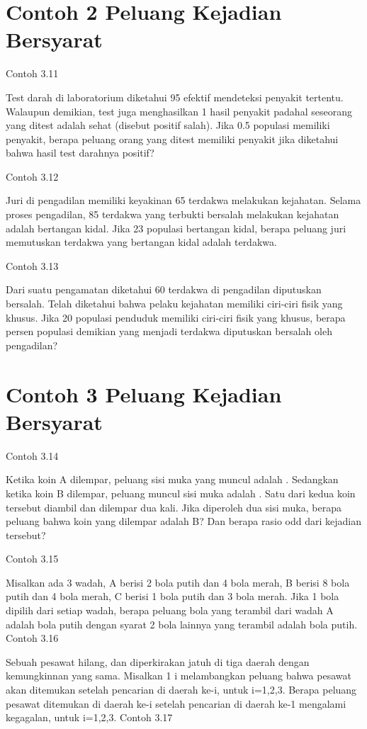 \documentclass[11pt,fleqn]{book} %
\begin{document}
{{\section{Contoh 2 Peluang Kejadian Bersyarat}

Contoh 3.11

Test darah di laboratorium diketahui 95 efektif mendeteksi penyakit tertentu. Walaupun demikian, test juga menghasilkan 1 hasil penyakit padahal seseorang yang ditest adalah sehat (disebut positif salah). Jika 0.5 populasi memiliki penyakit, berapa peluang orang yang ditest memiliki penyakit jika diketahui bahwa hasil test darahnya positif?

Contoh 3.12

Juri di pengadilan memiliki keyakinan 65 terdakwa melakukan kejahatan. Selama proses pengadilan, 85 terdakwa yang terbukti bersalah melakukan kejahatan adalah bertangan kidal. Jika 23 populasi bertangan kidal, berapa peluang juri memutuskan terdakwa yang bertangan kidal adalah terdakwa.

Contoh 3.13

Dari suatu pengamatan diketahui 60 terdakwa di pengadilan diputuskan bersalah. Telah diketahui bahwa pelaku kejahatan memiliki ciri-ciri fisik yang khusus. Jika 20 populasi penduduk memiliki ciri-ciri fisik yang khusus, berapa persen populasi demikian yang menjadi terdakwa diputuskan bersalah oleh pengadilan?


\section{Contoh 3 Peluang Kejadian Bersyarat}

Contoh 3.14

Ketika koin A dilempar, peluang sisi muka yang muncul adalah  . Sedangkan ketika koin B dilempar, peluang muncul sisi muka adalah  . Satu dari kedua koin tersebut diambil dan dilempar dua kali. Jika diperoleh dua sisi muka, berapa peluang bahwa koin yang dilempar adalah B? Dan berapa rasio odd dari kejadian tersebut?

Contoh 3.15

Misalkan ada 3 wadah, A berisi 2 bola putih dan 4 bola merah, B berisi 8 bola putih dan 4 bola merah, C berisi 1 bola putih dan 3 bola merah. Jika 1 bola dipilih dari setiap wadah, berapa peluang bola yang terambil dari wadah A adalah bola putih dengan syarat 2 bola lainnya yang terambil adalah bola putih.
Contoh 3.16

Sebuah pesawat hilang, dan diperkirakan jatuh di tiga daerah dengan kemungkinnan yang sama. Misalkan 1 i melambangkan peluang bahwa pesawat akan ditemukan setelah pencarian di daerah ke-i, untuk i=1,2,3. Berapa peluang pesawat ditemukan di daerah ke-i setelah pencarian di daerah ke-1 mengalami kegagalan, untuk i=1,2,3.
Contoh 3.17

}}
\end{document}
